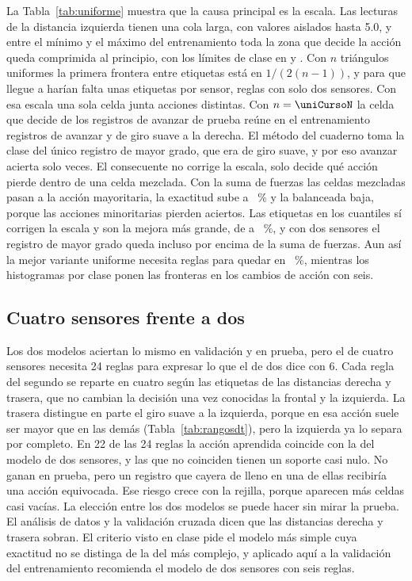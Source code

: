 \documentclass[11pt,letterpaper]{article}
\begin{document}
La Tabla~\ref{tab:uniforme} muestra que la causa principal es la escala. Las lecturas de la distancia izquierda tienen una cola larga, con valores aislados hasta 5.0, y entre el mínimo y el máximo del entrenamiento toda la zona que decide la acción queda comprimida al principio, con los límites de clase en \escIzqA{} y \escIzqB. Con $n$ triángulos uniformes la primera frontera entre etiquetas está en $1/(2(n-1))$, y para que llegue a \escIzqA{} harían falta unas \nNecesario{} etiquetas por sensor, \reglasNecesarias{} reglas con solo dos sensores. Con esa escala una sola celda junta acciones distintas. Con $n=\uniCursoN$ la celda que decide \avCelda{} de los \nAvanzarTe{} registros de avanzar de prueba reúne en el entrenamiento \mezclaAvanzar{} registros de avanzar y \mezclaSuave{} de giro suave a la derecha. El método del cuaderno toma la clase del único registro de mayor grado, que era de giro suave, y por eso avanzar acierta solo \uniCursoAvanzar{} veces. El consecuente no corrige la escala, solo decide qué acción pierde dentro de una celda mezclada. Con la suma de fuerzas las celdas mezcladas pasan a la acción mayoritaria, la exactitud sube a \uniSumaAcc~\% y la balanceada baja, porque las acciones minoritarias pierden aciertos. Las etiquetas en los cuantiles sí corrigen la escala y son la mejora más grande, de \uniCursoAcc{} a \uniCuantAcc~\%, y con dos sensores el registro de mayor grado queda incluso por encima de la suma de fuerzas. Aun así la mejor variante uniforme necesita \uniCuantReglas{} reglas para quedar en \uniCuantAcc~\%, mientras los histogramas por clase ponen las fronteras en los cambios de acción con seis.

\subsection{Cuatro sensores frente a dos}

Los dos modelos aciertan lo mismo en validación y en prueba, pero el de cuatro sensores necesita 24 reglas para expresar lo que el de dos dice con 6. Cada regla del segundo se reparte en cuatro según las etiquetas de las distancias derecha y trasera, que no cambian la decisión una vez conocidas la frontal y la izquierda. La trasera distingue en parte el giro suave a la izquierda, porque en esa acción suele ser mayor que en las demás (Tabla~\ref{tab:rangosdt}), pero la izquierda ya lo separa por completo. En 22 de las 24 reglas la acción aprendida coincide con la del modelo de dos sensores, y las \nDistintas{} que no coinciden tienen un soporte casi nulo. No ganan en prueba, pero un registro que cayera de lleno en una de ellas recibiría una acción equivocada. Ese riesgo crece con la rejilla, porque aparecen más celdas casi vacías. La elección entre los dos modelos se puede hacer sin mirar la prueba. El análisis de datos y la validación cruzada dicen que las distancias derecha y trasera sobran. El criterio visto en clase pide el modelo más simple cuya exactitud no se distinga de la del más complejo, y aplicado aquí a la validación del entrenamiento recomienda el modelo de dos sensores con seis reglas.
\end{document}
